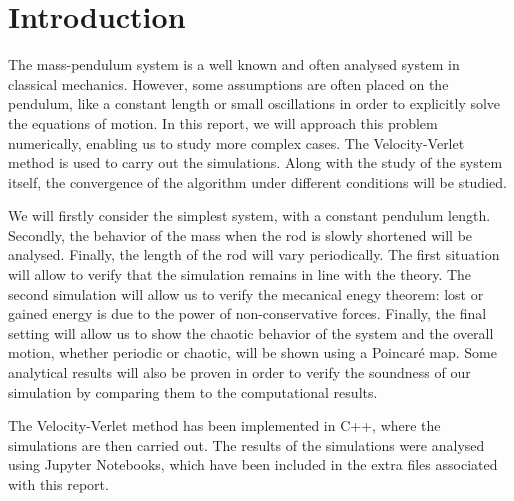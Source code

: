 \section{Introduction}

The mass-pendulum system is a well known and often analysed system in classical mechanics. However, some assumptions are often placed on the pendulum, like a constant length or small oscillations in order to explicitly solve the equations of motion. In this report, we will approach this problem numerically, enabling us to study more complex cases. The Velocity-Verlet method is used to carry out the simulations. Along with the study of the system itself, the convergence of the algorithm under different conditions will be studied.

We will firstly consider the simplest system, with a constant pendulum length. Secondly, the behavior of the mass when the rod is slowly shortened will be analysed. Finally, the length of the rod will vary periodically. The first situation will allow to verify that the simulation remains in line with the theory. The second simulation will allow us to verify the mecanical enegy theorem: lost or gained energy is due to the power of non-conservative forces. Finally, the final setting will allow us to show the chaotic behavior of the system and the overall motion, whether periodic or chaotic, will be shown using a Poincaré map. Some analytical results will also be proven in order to verify the soundness of our simulation by comparing them to the computational results.

The Velocity-Verlet method has been implemented in C++, where the simulations are then carried out. The results of the simulations were analysed using Jupyter Notebooks, which have been included in the extra files associated with this report.
